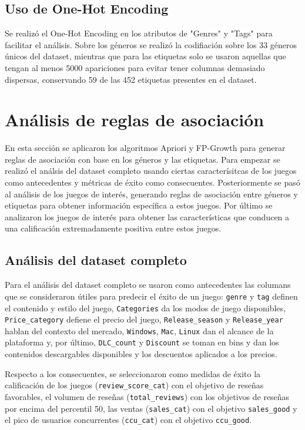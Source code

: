 \documentclass[conference]{IEEEtran}
\begin{document}
\subsection{Uso de One-Hot Encoding}
Se realizó el One-Hot Encoding en los atributos de "Genres" y "Tags" para facilitar el análisis. Sobre los géneros se realizó la codifiación sobre los 33 géneros únicos del dataset, mientras que para las etiquetas solo se usaron aquellas que tengan al menos 5000 apariciones para evitar tener columnas demasiado dispersas, conservando 59 de las 452 etiquetas presentes en el dataset.

\section{Análisis de reglas de asociación}
En esta sección se aplicaron los algoritmos Apriori y FP-Growth para generar reglas de asociación con base en los géneros y las etiquetas. Para empezar se realizó el análsis del dataset completo usando ciertas caracterísitcas de los juegos como antecedentes y métricas de éxito como consecuentes. Posteriormente se pasó al análisis de los juegos de interés, generando reglas de asociación entre géneros y etiquetas para obtener información específica a estos juegos. Por último se analizaron los juegos de interés para obtener las características que conducen a una calificación extremadamente positiva entre estos juegos.

\subsection{Análisis del dataset completo}
Para el análisis del dataset completo se usaron como antecedentes las columans que se consideraron útiles para predecir el éxito de un juego: \texttt{genre} y \texttt{tag} definen el contenido y estilo del juego, \texttt{Categories} da los modos de juego disponibles, \texttt{Price\_category} defiene el precio del juego, \texttt{Release\_season} y \texttt{Release\_year} hablan del contexto del mercado, \texttt{Windows}, \texttt{Mac}, \texttt{Linux} dan el alcance de la plataforma y, por último, \texttt{DLC\_count} y \texttt{Discount} se toman en bins y dan los contenidos descargables disponibles y los descuentos aplicados a los precios.

Respecto a los consecuentes, se seleccionaron como medidas de éxito la calificación de los juegos (\texttt{review\_score\_cat}) con el objetivo de reseñas favorables, el volumen de reseñas (\texttt{total\_reviews}) con los objetivos de reseñas por encima del percentil 50, las ventas (\texttt{sales\_cat}) con el objetivo \texttt{sales\_good} y el pico de usuarios concurrentes (\texttt{ccu\_cat}) con el objetivo \texttt{ccu\_good}.
\end{document}
